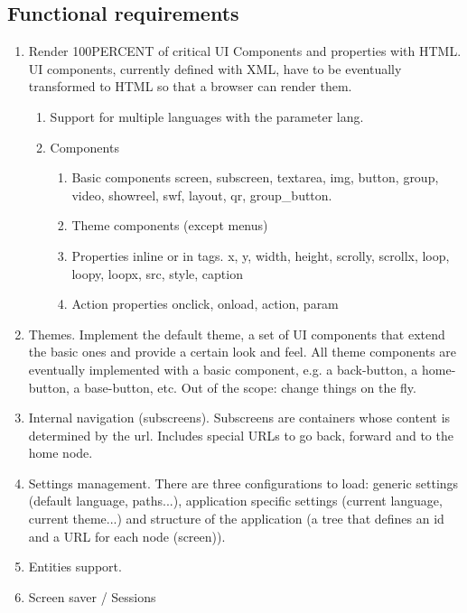 \subsection{Functional requirements}
\begin{enumerate}
    \item Render 100PERCENT of critical \ac{UI} Components and properties with \ac{HTML}. \ac{UI} components, currently defined with \ac{XML}, have to be eventually transformed to \ac{HTML} so that a browser can render them.
    \begin{enumerate}
        \item Support for multiple languages with the parameter lang.
        \item Components 
        \begin{enumerate}
            \item Basic components screen, subscreen, textarea, img, button, group, video, showreel, swf, layout, qr, group\_button.
            \item Theme components (except menus)
            \item Properties inline or in tags. x, y, width, height, scrolly, scrollx, loop, loopy, loopx, src, style, caption
            \item Action properties onclick, onload, action, param
        \end{enumerate}
        
    \end{enumerate}
    \item Themes. Implement the default theme, a set of UI components that extend the basic ones and provide a certain look and feel. All theme components are eventually implemented with a basic component, e.g. a back-button, a home-button, a base-button, etc. Out of the scope: change things on the fly.
    \item Internal navigation (subscreens). Subscreens are containers whose content is determined by the url. Includes special \ac{URL}s to go back, forward and to the home node.
    \item Settings management. There are three configurations to load: generic settings (default language, paths...), application specific settings (current language, current theme...) and structure of the application (a tree that defines an id and a \ac{URL} for each node (screen)).
    \item Entities support. 
    \item Screen saver / Sessions
\end{enumerate}


